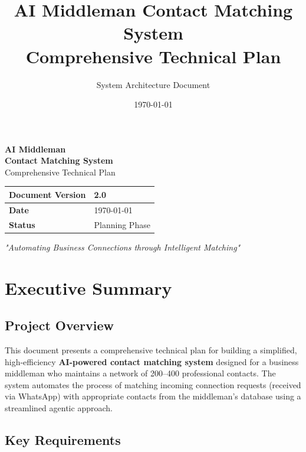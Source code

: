 \documentclass[12pt, a4paper]{report}
\title{\textbf{\Huge AI Middleman Contact Matching System}\\[1em]
\Large Comprehensive Technical Plan}
\author{System Architecture Document}
\date{\today}
\begin{document}
\begin{titlepage}
    \centering
    \vspace*{2cm}
    
    {\Huge\bfseries\color{primaryblue}AI Middleman}\\[0.5em]
    {\LARGE\bfseries Contact Matching System}\\[2cm]
    
    {\large Comprehensive Technical Plan}\\[1cm]
    
    \vspace{1cm}
    
    \begin{tabular}{|l|l|}
        \hline
        \textbf{Document Version} & 2.0 \\
        \hline
        \textbf{Date} & \today \\
        \hline
        \textbf{Status} & Planning Phase \\
        \hline
    \end{tabular}
    
    \vfill
    
    {\large\itshape "Automating Business Connections through Intelligent Matching"}
    
    \vspace{2cm}
\end{titlepage}

\tableofcontents
\newpage

\chapter{Executive Summary}

\section{Project Overview}

This document presents a comprehensive technical plan for building a simplified, high-efficiency \textbf{AI-powered contact matching system} designed for a business middleman who maintains a network of 200--400 professional contacts. The system automates the process of matching incoming connection requests (received via WhatsApp) with appropriate contacts from the middleman's database using a streamlined agentic approach.

\section{Key Requirements}
\end{document}
